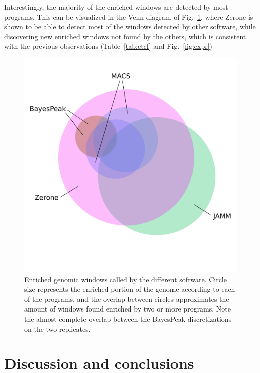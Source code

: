 \documentclass{bioinfo}
\begin{document}
Interestingly, the majority of the enriched windows are detected by most
programs. This can be visualized in the Venn diagram of Fig.~\ref{fig:venn},
where Zerone is shown to be able to detect most of the windows detected by other
software, while discovering new enriched windows not found by the others, which
is consistent with the previous observations (Table~\ref{tab:ctcf} and
Fig.~\ref{fig:expr})

\begin{figure}[!tpb]
\centerline{\includegraphics[scale=0.5]{histone_venn_color_names.pdf}}
\caption{Enriched genomic windows called by the different software. Circle size
represents the enriched portion of the genome according to each of the programs,
and the overlap between circles approximates the amount of windows found
enriched by two or more programs. Note the almost complete overlap between the
BayesPeak discretizations on the two replicates.}\label{fig:venn}
\end{figure}
\section{Discussion and conclusions}
\end{document}
